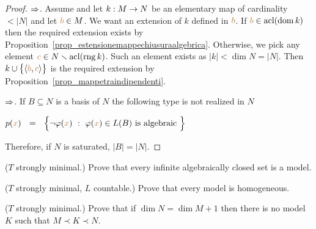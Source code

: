 \begin{proof}
  $\Rightarrow$.
  Assume  and let $k:M\rightarrow N$ be an elementary map of cardinality $<|N|$ and let ${\color{brown} b}\in M$.
  We want an extension of $k$ defined in ${\color{brown} b}$.
  If ${\color{brown} b}\in{\rm acl}(\mathop{\rm dom} k)$ then the required extension exists by Proposition~\ref{prop_estensionemappechiusuraalgebrica}.
  Otherwise, we pick any element ${\color{brown} c}\in N\smallsetminus{\rm acl}(\mathop{\rm rng} k)$.
  Such an element exists as $|k|<\dim N=|N|$.
  Then $k\cup\big\{\langle{\color{brown}b},{\color{brown} c}\rangle\big\}$ is the required extension by Proposition~\ref{prop_mappetraindipendenti}.

  $\Rightarrow$.
  If $B\subseteq N$ is a basis of $N$ the following type is not realized in $N$

  \hfil $p({\color{brown} x})\ \ =\ \ \Big\{\neg\varphi({\color{brown} x})\ :\ \varphi({\color{brown} x})\in L(B)\textrm{ is algebraic }\Big\}$

  Therefore, if $N$ is saturated, $|B|=|N|$.
\end{proof}

\begin{exercise}\label{ex_infinite_acl}
  ($T$ strongly minimal.) Prove that every infinite algebraically closed set is a model.
\end{exercise}

\begin{exercise}
  ($T$ strongly minimal, $L$ countable.) Prove that every model is homogeneous. 
\end{exercise}

\begin{exercise}
  ($T$ strongly minimal.) Prove that if $\dim N=\dim M+1$ then there is no model $K$ such that $M\prec K\prec N$. 
\end{exercise}




% 

